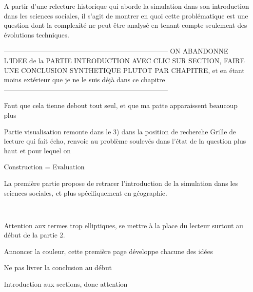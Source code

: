 A partir d'une relecture historique qui aborde la simulation dans son introduction dans les sciences sociales, il s'agit de montrer en quoi cette problématique est une question dont la complexité ne peut être analysé en tenant compte seulement des évolutions techniques.

------------------------------------------------------------------------
ON ABANDONNE L'IDEE de la PARTIE INTRODUCTION AVEC CLIC SUR SECTION, FAIRE UNE CONCLUSION SYNTHETIQUE PLUTOT PAR CHAPITRE, et en étant moins extérieur que je ne le suis déjà dans ce chapitre
------------------------------------------------------------------------



Faut que cela tienne debout tout seul, et que ma patte apparaissent beaucoup plus 

Partie visualisation remonte dans le 3) dans la position de recherche
Grille de lecture qui fait écho, renvoie au problème soulevés dans l'état de la question plus haut et pour lequel on 






Construction = Evaluation

La première partie propose de retracer l'introduction de la simulation dans les sciences sociales, et plus spécifiquement en géographie. 




---

Attention aux termes trop elliptiques, se mettre à la place du lecteur surtout au début de la partie 2.

Annoncer la couleur, cette première page développe chacune des idées 


Ne pas livrer la conclusion au début 

Introduction aux sections, donc attention 



\printbibliography[heading=subbibliography]

\stopcontents[chapters]
